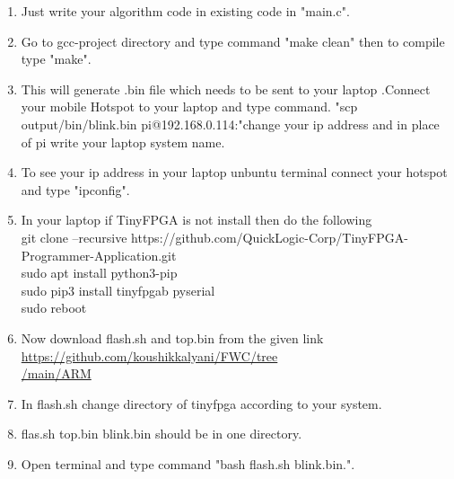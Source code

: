 \documentclass[journal,12pt,twocolumn]{IEEEtran}
\begin{document}
 \begin{enumerate}[label={\arabic*}.]
     \item Just write your algorithm code in existing code in "main.c".
     \item Go to gcc-project directory and type command "make clean" then to compile type "make".
     \item This will generate .bin file which needs to be sent to your laptop .Connect your mobile Hotspot to your laptop and type command.
     "scp  output/bin/blink.bin pi@192.168.0.114:"change your ip address and in place of pi write your laptop system name.
     \item To see your ip address in your laptop unbuntu terminal connect your hotspot and type "ipconfig".
     \item In your laptop if TinyFPGA is not install then do the following\\
     git clone --recursive https://github.com/QuickLogic-Corp/TinyFPGA-Programmer-Application.git\\
     sudo apt install python3-pip\\
     sudo pip3 install tinyfpgab pyserial\\
     sudo reboot\\
     \item Now download flash.sh and top.bin from the given link\\
     \href{https://github.com/koushikkalyani/FWC/tree/main/ARM}{https://github.com/koushikkalyani/FWC/tree\\/main/ARM}
     \item In flash.sh change directory of tinyfpga according to your system.
     \item flas.sh   top.bin  blink.bin should be in one directory. 
     \item Open terminal and type command "bash flash.sh blink.bin.".
 \end{enumerate}
\end{document}
